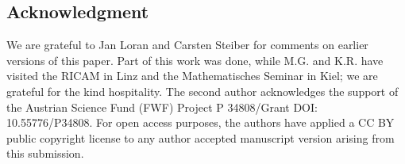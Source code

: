 \documentclass{article}
\theoremstyle{plain}
\theoremstyle{definition}
\begin{document}
\subsection*{Acknowledgment}

We are grateful to Jan Loran and Carsten Steiber
for comments on earlier versions of this paper.
Part of this work was done, while M.G. and K.R. have visited 
the RICAM in Linz and the Mathematisches Seminar in Kiel; we are
grateful for the kind hospitality. The second author acknowledges the 
support of the Austrian Science Fund (FWF) Project  
P 34808/Grant DOI: 10.55776/P34808. For open access purposes, the authors 
have applied a CC BY public copyright license to any author accepted 
manuscript version arising from this submission.

\footnotesize


\end{document}
